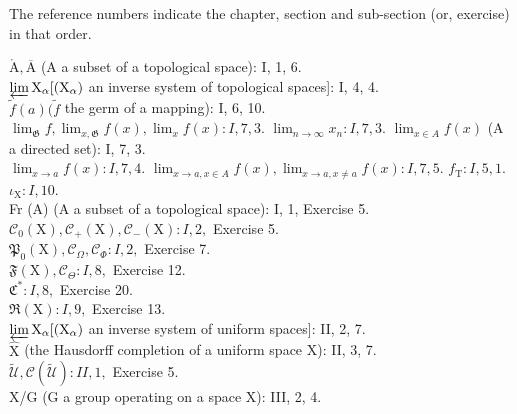 
The reference numbers indicate the chapter, section and sub-section (or, exercise) in that order.

\(\mathring{\mathrm{A}}, \overline{\mathrm{A}}\) (A a subset of a topological space): I, 1, 6.\\
\(\varprojlim \mathrm{X}_{\alpha}[(\mathrm{X}_{\alpha})\) an inverse system of topological spaces{]}: I, 4, 4.\\
\(\tilde{f}(a) (\tilde{f}\) the germ of a mapping): I, 6, 10.\\
\(\lim_{\mathfrak{G}} f, \lim_{x, \mathfrak{G}} f(x), \lim_{x} f(x): I, 7, 3.\) \(\lim_{n \to \infty} x_n: I, 7, 3.\) \(\lim_{x \in A} f(x)\) (A a directed set): I, 7, 3.\\
\(\lim_{x \to a} f(x): I, 7, 4.\) \(\lim_{x \to a, x \in A} f(x), \lim_{x \to a, x \neq a} f(x): I, 7, 5.\) \(f_{\mathrm{T}}: I, 5, 1.\) \(\iota_{\mathrm{X}}: I, 10.\)\\
Fr (A) (A a subset of a topological space): I, 1, Exercise 5.\\
\(\mathcal{C}_0(\mathrm{X}), \mathcal{C}_+(\mathrm{X}), \mathcal{C}_-(\mathrm{X}): I, 2,\) Exercise 5.\\
\(\mathfrak{P}_0(\mathrm{X}), \mathcal{C}_\Omega, \mathcal{C}_\Phi: I, 2,\) Exercise 7.\\
\(\mathfrak{F}(\mathrm{X}), \mathcal{C}_\Theta: I, 8,\) Exercise 12.\\
\(\mathfrak{C}^*: I, 8,\) Exercise 20.\\
\(\mathfrak{R}(\mathrm{X}): I, 9,\) Exercise 13.\\
\(\varprojlim \mathrm{X}_{\alpha}[(\mathrm{X}_{\alpha})\) an inverse system of uniform spaces{]}: II, 2, 7.\\
\(\hat{\mathrm{X}}\) (the Hausdorff completion of a uniform space X): II, 3, 7.\\
\(\tilde{\mathcal{U}}, \mathcal{C}(\tilde{\mathcal{U}}): II, 1,\) Exercise 5.\\
X/G (G a group operating on a space X): III, 2, 4.

